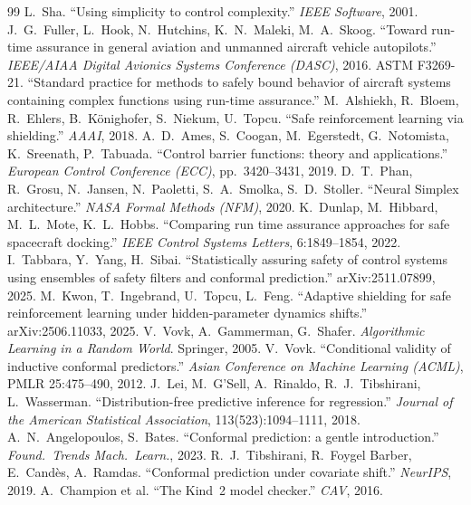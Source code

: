 \documentclass[11pt]{article}
\theoremstyle{plain}
\theoremstyle{definition}
\begin{document}
\begin{thebibliography}{99}\small
{} L.~Sha. ``Using simplicity to control complexity.'' \emph{IEEE Software}, 2001.
 J.~G.~Fuller, L.~Hook, N.~Hutchins, K.~N.~Maleki, M.~A.~Skoog. ``Toward run-time assurance in general aviation and unmanned aircraft vehicle autopilots.'' \emph{IEEE/AIAA Digital Avionics Systems Conference (DASC)}, 2016.
 ASTM F3269-21. ``Standard practice for methods to safely bound behavior of aircraft systems containing complex functions using run-time assurance.''
 M.~Alshiekh, R.~Bloem, R.~Ehlers, B.~K\"onighofer, S.~Niekum, U.~Topcu. ``Safe reinforcement learning via shielding.'' \emph{AAAI}, 2018.
 A.~D.~Ames, S.~Coogan, M.~Egerstedt, G.~Notomista, K.~Sreenath, P.~Tabuada. ``Control barrier functions: theory and applications.'' \emph{European Control Conference (ECC)}, pp.\ 3420--3431, 2019.
 D.~T.~Phan, R.~Grosu, N.~Jansen, N.~Paoletti, S.~A.~Smolka, S.~D.~Stoller. ``Neural Simplex architecture.'' \emph{NASA Formal Methods (NFM)}, 2020.
 K.~Dunlap, M.~Hibbard, M.~L.~Mote, K.~L.~Hobbs. ``Comparing run time assurance approaches for safe spacecraft docking.'' \emph{IEEE Control Systems Letters}, 6:1849--1854, 2022.
 I.~Tabbara, Y.~Yang, H.~Sibai. ``Statistically assuring safety of control systems using ensembles of safety filters and conformal prediction.'' arXiv:2511.07899, 2025.
 M.~Kwon, T.~Ingebrand, U.~Topcu, L.~Feng. ``Adaptive shielding for safe reinforcement learning under hidden-parameter dynamics shifts.'' arXiv:2506.11033, 2025.
 V.~Vovk, A.~Gammerman, G.~Shafer. \emph{Algorithmic Learning in a Random World}. Springer, 2005.
 V.~Vovk. ``Conditional validity of inductive conformal predictors.'' \emph{Asian Conference on Machine Learning (ACML)}, PMLR 25:475--490, 2012.
 J.~Lei, M.~G'Sell, A.~Rinaldo, R.~J.~Tibshirani, L.~Wasserman. ``Distribution-free predictive inference for regression.'' \emph{Journal of the American Statistical Association}, 113(523):1094--1111, 2018.
 A.~N.~Angelopoulos, S.~Bates. ``Conformal prediction: a gentle introduction.'' \emph{Found.\ Trends Mach.\ Learn.}, 2023.
 R.~J.~Tibshirani, R.~Foygel Barber, E.~Cand\`es, A.~Ramdas. ``Conformal prediction under covariate shift.'' \emph{NeurIPS}, 2019.
 A.~Champion et al. ``The Kind~2 model checker.'' \emph{CAV}, 2016.
\end{thebibliography}
\end{document}
